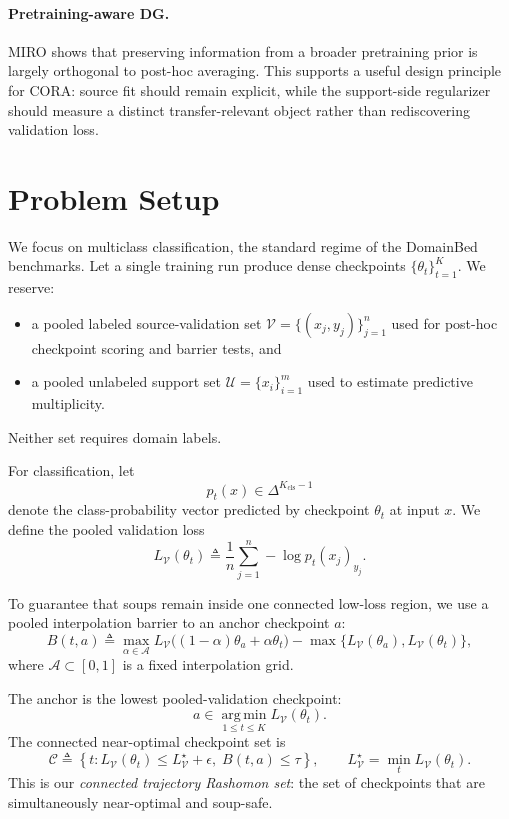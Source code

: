 \documentclass{article}
\newcommand{\cC}{\mathcal{C}}
\newcommand{\cU}{\mathcal{U}}
\newcommand{\cV}{\mathcal{V}}
\newcommand{\cA}{\mathcal{A}}
\newcommand{\argmin}{\operatorname*{arg\,min}}
\newcommand{\cora}{\textup{\textsc{CORA}}}
\newcommand{\miro}{\textup{\textsc{MIRO}}}
\newcommand{\simplex}{\Delta}
\begin{document}
\paragraph{Pretraining-aware DG.}
\miro{} \citep{cha2022miro} shows that preserving information from a broader pretraining prior is largely orthogonal to post-hoc averaging. This supports a useful design principle for \cora{}: source fit should remain explicit, while the support-side regularizer should measure a distinct transfer-relevant object rather than rediscovering validation loss.

\section{Problem Setup}
\label{sec:setup}

We focus on multiclass classification, the standard regime of the DomainBed benchmarks. Let a single training run produce dense checkpoints $\{\theta_t\}_{t=1}^{K}$. We reserve:
\begin{itemize}[leftmargin=1.4em]
    \item a pooled labeled source-validation set $\cV = \{(x_j,y_j)\}_{j=1}^{n}$ used for post-hoc checkpoint scoring and barrier tests, and
    \item a pooled unlabeled support set $\cU = \{x_i\}_{i=1}^{m}$ used to estimate predictive multiplicity.
\end{itemize}
Neither set requires domain labels.

For classification, let
\[
    p_t(x) \in \simplex^{K_{\mathrm{cls}}-1}
\]
denote the class-probability vector predicted by checkpoint $\theta_t$ at input $x$. We define the pooled validation loss
\begin{equation}
    L_{\cV}(\theta_t)
    \triangleq
    \frac{1}{n}\sum_{j=1}^{n} -\log p_t(x_j)_{y_j}.
    \label{eq:val_loss}
\end{equation}

To guarantee that soups remain inside one connected low-loss region, we use a pooled interpolation barrier to an anchor checkpoint $a$:
\begin{equation}
    B(t,a)
    \triangleq
    \max_{\alpha \in \cA}
    L_{\cV}\!\big((1-\alpha)\theta_a + \alpha \theta_t\big)
    -
    \max\{L_{\cV}(\theta_a), L_{\cV}(\theta_t)\},
    \label{eq:barrier}
\end{equation}
where $\cA \subset [0,1]$ is a fixed interpolation grid.

The anchor is the lowest pooled-validation checkpoint:
\begin{equation}
    a \in \argmin_{1 \le t \le K} L_{\cV}(\theta_t).
    \label{eq:anchor}
\end{equation}
The connected near-optimal checkpoint set is
\begin{equation}
    \cC
    \triangleq
    \left\{
        t :
        L_{\cV}(\theta_t) \le L_{\cV}^{\star} + \epsilon,
        \;
        B(t,a) \le \tau
    \right\},
    \qquad
    L_{\cV}^{\star} = \min_t L_{\cV}(\theta_t).
    \label{eq:candidate_set}
\end{equation}
This is our \emph{connected trajectory Rashomon set}: the set of checkpoints that are simultaneously near-optimal and soup-safe.
\end{document}
